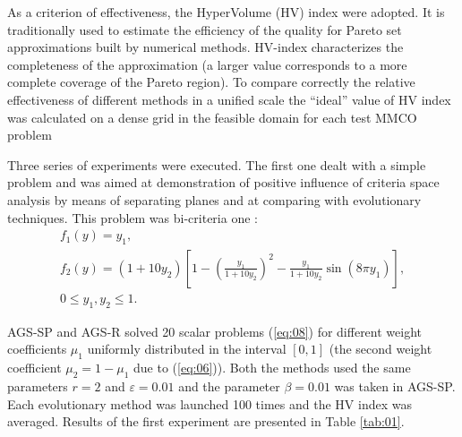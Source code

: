 \documentclass[runningheads]{llncs}
\begin{document}
As a criterion of effectiveness, the HyperVolume (HV) index \cite{Evtushenko2014,Gergel2018} were adopted. It is traditionally used to estimate the efficiency of the quality for Pareto set approximations built by numerical methods. HV-index characterizes the completeness of the approximation (a larger value corresponds to a more complete coverage of the Pareto region). To compare correctly the relative effectiveness of different methods in a unified scale the ``ideal'' value of HV index was calculated on a dense grid in the feasible domain for each test MMCO problem

Three series of experiments were executed. The first one dealt with a simple problem and was aimed at demonstration of positive influence of criteria space analysis by means of separating planes and at comparing with evolutionary techniques.
This problem was bi-criteria one \cite{CHIANDUSSI2012912}:
\begin{equation}
    \label{eq:28}
    \begin{matrix}
f_1 (y)=y_1, \\
f_2 (y)=(1+10y_2 )[1- \left(\frac{y_1}{1+10y_2} \right)^2- \frac{y_1}{1+10y_2} \sin(8 \pi y_1 ) ], \\
0 \leq y_1,y_2 \leq 1.
    \end{matrix}
\end{equation}

AGS-SP and AGS-R solved 20 scalar problems (\ref{eq:08}) for different weight coefficients $\mu_1$ uniformly distributed in the interval $[0,1]$ (the second weight coefficient $\mu_2=1-\mu_1$ due to (\ref{eq:06})). Both the methods used the same parameters $r=2$ and $\varepsilon=0.01$ and the parameter $\beta=0.01$ was taken in AGS-SP. Each evolutionary method was launched 100 times and the HV index was averaged.
Results of the first experiment are presented in Table \ref{tab:01}.
\end{document}

